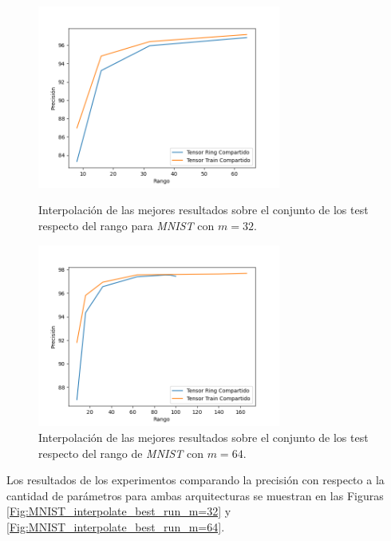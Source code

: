 \documentclass[spanish]{article}
\theoremstyle{definition}
\theoremstyle{remark}
\numberwithin{equation}{section}
\numberwithin{equation}{section} %
\begin{document}
\begin{figure}[H]
   \begin{minipage}{0.48\textwidth}
     \centering
     \captionsetup{justification=centering}
     \includegraphics[trim={0.8cm 0 1cm 1cm},clip,width=8cm]{img/MNIST/MNIST_interpolate_best_run_m=32_vs_ranks.png}
     \caption{Interpolación de las mejores resultados  sobre el conjunto de los test respecto del rango para \textit{MNIST} con $m=32$.}\label{Fig:MNIST_interpolate_best_run_m=32_vs_ranks}
   \end{minipage}\hfill
   \begin{minipage}{0.48\textwidth}
     \centering
     \captionsetup{justification=centering}
     \includegraphics[trim={0.8cm 0 1cm 1cm},clip,width=8cm]{img/MNIST/MNIST_interpolate_best_run_m=64_vs_ranks.png}
     \caption{Interpolación de las mejores resultados  sobre el conjunto de los test respecto del rango de \textit{MNIST} con $m=64$.}\label{Fig:MNIST_interpolate_best_run_m=64_vs_ranks}
   \end{minipage}
\end{figure} \par
Los resultados de los experimentos comparando la precisión con respecto a la cantidad de parámetros para ambas arquitecturas se muestran en las Figuras \ref{Fig:MNIST_interpolate_best_run_m=32} y \ref{Fig:MNIST_interpolate_best_run_m=64}.
\end{document}
